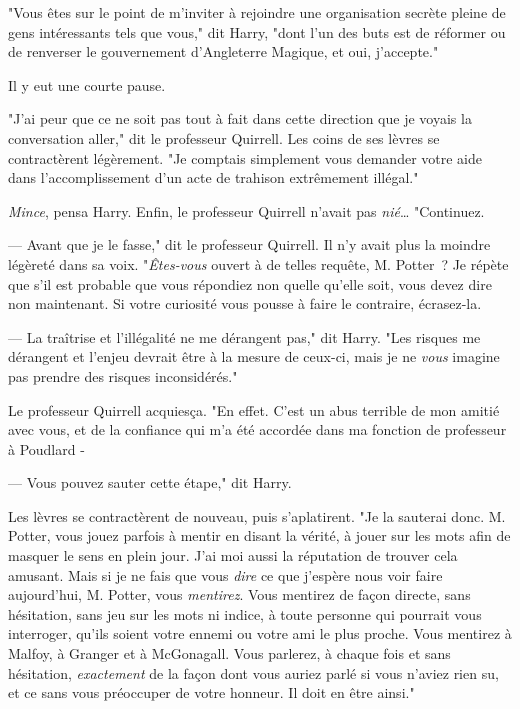 "Vous êtes sur le point de m'inviter à rejoindre une organisation secrète pleine de gens intéressants tels que vous," dit Harry, "dont l'un des buts est de réformer ou de renverser le gouvernement d'Angleterre Magique, et oui, j'accepte."

Il y eut une courte pause.

"J'ai peur que ce ne soit pas tout à fait dans cette direction que je voyais la conversation aller," dit le professeur Quirrell. Les coins de ses lèvres se contractèrent légèrement. "Je comptais simplement vous demander votre aide dans l'accomplissement d'un acte de trahison extrêmement illégal."

\emph{Mince}, pensa Harry. Enfin, le professeur Quirrell n'avait pas \emph{nié}… "Continuez.

--- Avant que je le fasse," dit le professeur Quirrell. Il n'y avait plus la moindre légèreté dans sa voix. "\emph{Êtes-vous} ouvert à de telles requête, M. Potter~? Je répète que s'il est probable que vous répondiez non quelle qu'elle soit, vous devez dire non maintenant. Si votre curiosité vous pousse à faire le contraire, écrasez-la.

--- La traîtrise et l'illégalité ne me dérangent pas," dit Harry. "Les risques me dérangent et l'enjeu devrait être à la mesure de ceux-ci, mais je ne \emph{vous} imagine pas prendre des risques inconsidérés."

Le professeur Quirrell acquiesça. "En effet. C'est un abus terrible de mon amitié avec vous, et de la confiance qui m'a été accordée dans ma fonction de professeur à Poudlard -

--- Vous pouvez sauter cette étape," dit Harry.

Les lèvres se contractèrent de nouveau, puis s'aplatirent. "Je la sauterai donc. M. Potter, vous jouez parfois à mentir en disant la vérité, à jouer sur les mots afin de masquer le sens en plein jour. J'ai moi aussi la réputation de trouver cela amusant. Mais si je ne fais que vous \emph{dire} ce que j'espère nous voir faire aujourd'hui, M. Potter, vous \emph{mentirez}. Vous mentirez de façon directe, sans hésitation, sans jeu sur les mots ni indice, à toute personne qui pourrait vous interroger, qu'ils soient votre ennemi ou votre ami le plus proche. Vous mentirez à Malfoy, à Granger et à McGonagall. Vous parlerez, à chaque fois et sans hésitation, \emph{exactement} de la façon dont vous auriez parlé si vous n'aviez rien su, et ce sans vous préoccuper de votre honneur. Il doit en être ainsi."

